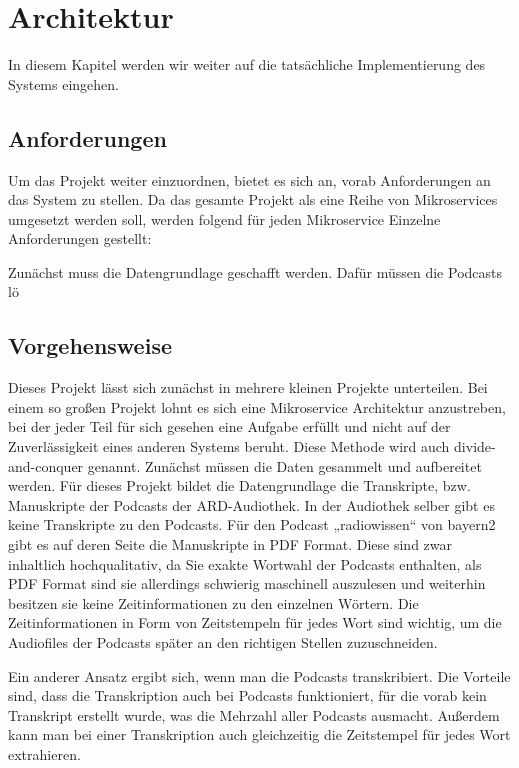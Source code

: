 \chapter{Architektur}\label{ch:method}

In diesem Kapitel werden wir weiter auf die tatsächliche Implementierung des Systems eingehen.

\section{Anforderungen}

Um das Projekt weiter einzuordnen, bietet es sich an, vorab Anforderungen an das System zu stellen. 
Da das gesamte Projekt als eine Reihe von Mikroservices umgesetzt werden soll, werden folgend für jeden Mikroservice Einzelne Anforderungen gestellt: 

Zunächst muss die Datengrundlage geschafft werden. Dafür müssen die Podcasts lö

\section{Vorgehensweise}

Dieses Projekt lässt sich zunächst in mehrere kleinen Projekte unterteilen. 
Bei einem so großen Projekt lohnt es sich eine Mikroservice Architektur anzustreben, bei der jeder Teil für sich gesehen eine Aufgabe erfüllt und nicht auf der Zuverlässigkeit eines anderen Systems beruht. 
Diese Methode wird auch divide-and-conquer genannt. 
Zunächst müssen die Daten gesammelt und aufbereitet werden. 
Für dieses Projekt bildet die Datengrundlage die Transkripte, bzw. Manuskripte der Podcasts der ARD-Audiothek. 
In der Audiothek selber gibt es keine Transkripte zu den Podcasts. 
Für den Podcast „radiowissen“ von bayern2 gibt es auf deren Seite die Manuskripte in PDF Format. 
Diese sind zwar inhaltlich hochqualitativ, da Sie exakte Wortwahl der Podcasts enthalten, als PDF Format sind sie allerdings schwierig maschinell auszulesen und weiterhin besitzen sie keine Zeitinformationen zu den einzelnen Wörtern. 
Die Zeitinformationen in Form von Zeitstempeln für jedes Wort sind wichtig, um die Audiofiles der Podcasts später an den richtigen Stellen zuzuschneiden. 

Ein anderer Ansatz ergibt sich, wenn man die Podcasts transkribiert. 
Die Vorteile sind, dass die Transkription auch bei Podcasts funktioniert, für die vorab kein Transkript erstellt wurde, was die Mehrzahl aller Podcasts ausmacht. 
Außerdem kann man bei einer Transkription auch gleichzeitig die Zeitstempel für jedes Wort extrahieren.




